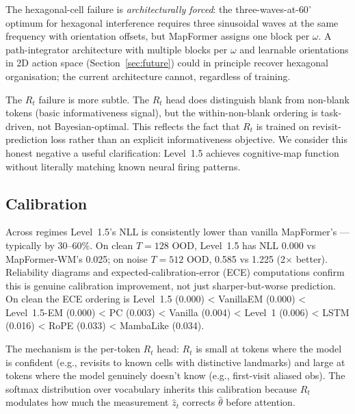 The hexagonal-cell failure is \emph{architecturally forced}: the
three-waves-at-$60^\circ$ optimum for hexagonal interference requires
three sinusoidal waves at the same frequency with orientation offsets,
but MapFormer assigns one block per $\omega$. A path-integrator
architecture with multiple blocks per $\omega$ and learnable
orientations in 2D action space (Section~\ref{sec:future}) could in
principle recover hexagonal organisation; the current architecture
cannot, regardless of training.

The $R_t$ failure is more subtle. The $R_t$ head does distinguish blank
from non-blank tokens (basic informativeness signal), but the
within-non-blank ordering is task-driven, not Bayesian-optimal. This
reflects the fact that $R_t$ is trained on revisit-prediction loss
rather than an explicit informativeness objective. We consider this
honest negative a useful clarification: Level~1.5 achieves cognitive-map
function without literally matching known neural firing patterns.

\subsection{Calibration}

Across regimes Level~1.5's NLL is consistently lower than vanilla
MapFormer's --- typically by 30--60\%. On clean $T{=}128$ OOD,
Level~1.5 has NLL 0.000 vs MapFormer-WM's 0.025; on noise $T{=}512$ OOD,
0.585 vs 1.225 (2$\times$ better). Reliability diagrams and
expected-calibration-error (ECE) computations confirm this is genuine
calibration improvement, not just sharper-but-worse prediction. On
clean the ECE ordering is Level~1.5 (0.000) < VanillaEM (0.000) <
Level~1.5-EM (0.000) < PC (0.003) < Vanilla (0.004) < Level~1 (0.006)
< LSTM (0.016) < RoPE (0.033) < MambaLike (0.034).

The mechanism is the per-token $R_t$ head: $R_t$ is small at tokens
where the model is confident (e.g., revisits to known cells with
distinctive landmarks) and large at tokens where the model genuinely
doesn't know (e.g., first-visit aliased obs). The softmax distribution
over vocabulary inherits this calibration because $R_t$ modulates how
much the measurement $\hat z_t$ corrects $\hat\theta$ before attention.
